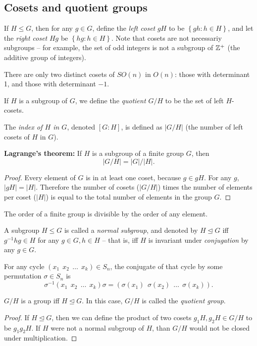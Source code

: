 \documentclass[class=article, crop=false]{standalone}
\begin{document}
\subsection{Cosets and quotient groups}
If $H \leq G$, then for any $g \in G$, define the \emph{left coset} $gH$ to be $\left\{ gh: h \in H \right\}$, and let the \emph{right coset} $Hg$ be $ \left\{ hg: h \in H \right\}$. Note that cosets are not necessariy subgroups -- for example, the set of odd integers is not a subgroup of $\mathbb{Z}^+$ (the additive group of integers).
\begin{example}
    There are only two distinct cosets of $SO(n)$ in $O(n)$: those with determinant 1, and those with determinant $-1$.
\end{example}
If $H$ is a subgroup of $G$, we define the \emph{quotient $G/H$} to be the set of left $H$-cosets.
\par
The \emph{index of $H$ in $G$}, denoted $[G:H]$, is defined as $|G/H|$ (the number of left cosets of $H$ in $G$).
\begin{thm}
    \textbf{Lagrange's theorem:} If $H$ is a subgroup of a finite group $G$, then
    \[ |G/H| = |G|/|H|. \]
\end{thm}

\begin{proof}
    Every element of $G$ is in at least one coset, because $g \in gH$. For any $g$, $|gH|=|H|$. Therefore the number of cosets ($|G/H|$) times the number of elements per coset ($|H|$) is equal to the total number of elements in the group $G$.
\end{proof}

\begin{cor}
    The order of a finite group is divisible by the order of any element.
\end{cor}
A subgroup $H \leq G$ is called a \emph{normal subgroup}, and denoted by $H \trianglelefteq G$ iff $g^{-1}hg \in H$ for any $g \in G, h \in H$ -- that is, iff $H$ is invariant under \emph{conjugation} by any $g \in G$.
\begin{thm}\label{permutationconjugation}
    For any cycle $(x_1\ \ x_2 \ \ \dots \ \ x_k) \in S_n$, the conjugate of that cycle by some permutation $\sigma \in S_n$ is
    \[ \sigma^{-1} (x_1\ \ x_2 \ \ \dots \ \ x_k) \sigma = (\sigma(x_1)\ \ \sigma(x_2) \ \ \dots \ \ \sigma(x_k)). \]
\end{thm}
\begin{thm}
    $G/H$ is a group iff $H \trianglelefteq G$. In this case, $G/H$ is called the \emph{quotient group}.
\end{thm}
\begin{proof}
    If $H \trianglelefteq G$, then we can define the product of two cosets $g_1H, g_2H \in G/H$ to be $g_1 g_2 H$. If $H$ were not a normal subgroup of $H$, than $G/H$ would not be closed under multiplication.
\end{proof}
\end{document}
